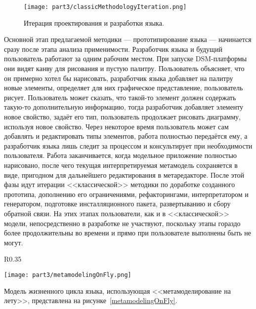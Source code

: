 \begin{figure} [ht]
	\begin{center}
		\texttt{[image: part3/classicMethodologyIteration.png]}
		\caption{Итерация проектирования и разработки языка.}
		\label{classicMethodologyIteration}
	\end{center}
\end{figure}

Основной этап предлагаемой методики --- прототипирование языка --- начинается сразу 
после этапа анализа применимости. Разработчик языка и будущий пользователь работают 
за одним рабочим местом. При запуске DSM-платформы они видят канву для рисования и 
пустую палитру. Пользователь объясняет, что он примерно хотел бы нарисовать, разработчик 
языка добавляет на палитру новые элементы, определяет для них графическое представление, 
пользователь рисует. Пользователь может сказать, что такой-то элемент должен содержать 
такую-то дополнительную информацию, тогда разработчик добавляет элементу новое свойство, 
задаёт его тип, пользователь продолжает рисовать диаграмму, используя новое свойство. 
Через некоторое время пользователь может сам добавлять и 
редактировать типы элементов, работа полностью передаётся ему, а разработчик языка 
лишь следит за процессом и консультирует при необходимости пользователя. Работа заканчивается, 
когда модельное приложение полностью нарисовано, после чего текущая интерпретируемая 
метамодель сохраняется в виде, пригодном для дальнейшего редактирования в метаредакторе. 
После этой фазы идут итерации <<классической>> методики по доработке созданного 
прототипа, дополнению его ограничениями, рефакторингами, интерпретатором и генератором, 
подготовке инсталляционного пакета, развертыванию и сбору обратной связи. На этих этапах 
пользователи, как и в <<классической>> модели, непосредственно в разработке не участвуют, 
поскольку этапы гораздо более продолжительны во времени и прямо при пользователе выполнены 
быть не могут.

\begin{wrapfigure}{R}{0.35\textwidth}
	\begin{center}
		\texttt{[image: part3/metamodelingOnFly.png]}
		\caption{Методика <<метамоделирования на лету>>.}
		\label{metamodelingOnFly}
	\end{center}
\end{wrapfigure}

Модель жизненного цикла языка, использующая <<метамоделирование на лету>>, представлена 
на рисунке~\ref{metamodelingOnFly}.

